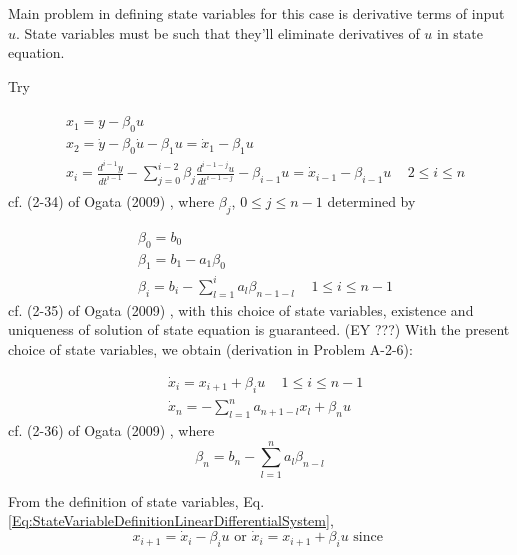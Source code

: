 \documentclass[10pt]{amsart}
\newcommand{\problemhead}[1]
  {
   \noindent{\small\bf Problem #1.}
   }
\begin{document}
\begin{multicols*}{2}
Main problem in defining state variables for this case is derivative terms of input $u$. State variables must be such that they'll eliminate derivatives of $u$ in state equation.

Try

\begin{equation}\label{Eq:StateVariableDefinitionLinearDifferentialSystem}
	\begin{gathered}
		\begin{aligned}
			& x_1 = y- \beta_0 u \\
			& x_2 = \dot{y} - \beta_0 \dot{u} - \beta_1 u = \dot{x}_1 - \beta_1 u \\
			& x_i = \frac{d^{i-1}y}{dt^{i-1}} - \sum_{j=0}^{i-2} \beta_j \frac{d^{i-1 -j} u}{dt^{i-1-j}} - \beta_{i-1} u = \dot{x}_{i-1} - \beta_{i-1}u \quad \, 2 \leq i \leq n
		\end{aligned}
	\end{gathered}
\end{equation}
cf. (2-34) of Ogata (2009) \cite{Ogat2009}, where $\beta_j$, $0\leq j \leq n-1$ determined by

\begin{equation}\label{Eq:BetaCoefficientsStateSpaceRepresentation}
	\begin{aligned}
		& \beta_0 = b_0 \\
		& \beta_1 = b_1 - a_1 \beta_0 \\
		& \beta_i = b_i - \sum_{l=1}^i a_l \beta_{n-1 - l } \quad \, 1 \leq i \leq n -1
	\end{aligned}
\end{equation}
cf. (2-35) of Ogata (2009) \cite{Ogat2009}, with this choice of state variables, existence and uniqueness of solution of state equation is guaranteed. (EY ???) With the present choice of state variables, we obtain (derivation in Problem A-2-6):

\begin{equation}\label{Eq:StateVariableDynamics}
	\begin{aligned}
		& \dot{x}_i = x_{i+1} + \beta_i u \quad \, 1 \leq i \leq n -1 \\
		& \dot{x}_n = -\sum_{l=1}^n a_{n+1 - l} x_l + \beta_n u
	\end{aligned}
\end{equation}
cf. (2-36) of Ogata (2009) \cite{Ogat2009}, where 
\[
\beta_n = b_n - \sum_{l=1}^n a_l \beta_{n-l}
\]

\problemhead{A-2-6} From the definition of state variables, Eq. \ref{Eq:StateVariableDefinitionLinearDifferentialSystem}, 
\[
x_{i+1} = \dot{x}_i - \beta_i u \text{ or } \dot{x}_i = x_{i+1} + \beta_i u \text{ since }
\]


\end{multicols*}
\end{document}
